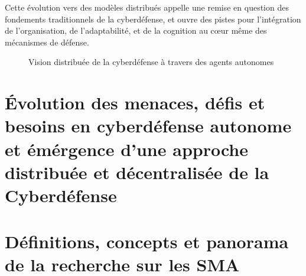 \documentclass[ twoside,openright,titlepage,numbers=noenddot,headinclude,%
                footinclude=true,cleardoublepage=empty,abstractoff, %
                BCOR=5mm,paper=a4,fontsize=11pt,%
                french,american,%
                ]{scrreprt}
\begin{document}
Cette évolution vers des modèles distribués appelle une remise en question des fondements traditionnels de la cyberdéfense, et ouvre des pistes pour l'intégration de l'organisation, de l'adaptabilité, et de la cognition au cœur même des mécanismes de défense.

\begin{figure}[h]
    \centering
    \caption{Vision distribuée de la cyberdéfense à travers des agents autonomes}
    \label{fig:distributed_cyberdefense}
\end{figure}


\section{Évolution des menaces, défis et besoins en cyberdéfense autonome et émérgence d'une approche distribuée et décentralisée de la Cyberdéfense}\label{sec:evolution-menaces}




\section{Définitions, concepts et panorama de la recherche sur les SMA}\label{sec:sma-concepts}

\end{document}
